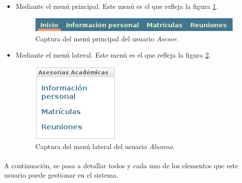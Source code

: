   \begin{itemize}
   \item Mediante el menú principal. Este menú es el que refleja la figura
   \ref{capturaMenuPrincipalAlumno}.

  \begin{figure}[!ht]
    \begin{center}
      \includegraphics[scale=0.55]{4.Funcionamiento_Aplicacion/4.3.Gestion/4.3.4.Alumno/4.3.4.1.Introduccion/menu_principal.png}
      \caption{Captura del menú principal del usuario \textit{Asesor}.}
      \label{capturaMenuPrincipalAlumno}
    \end{center}
  \end{figure}

   \item Mediante el menú lateral. Este menú es el que refleja la figura
   \ref{capturaMenuLateralAlumno}.

   \begin{figure}[!ht]
    \begin{center}
      \includegraphics[scale=0.55]{4.Funcionamiento_Aplicacion/4.3.Gestion/4.3.4.Alumno/4.3.4.1.Introduccion/menu_lateral.png}
      \caption{Captura del menú lateral del usuario \textit{Alumno}.}
      \label{capturaMenuLateralAlumno}
    \end{center}
  \end{figure}

  \end{itemize}

  \paragraph{}A continuación, se pasa a detallar todos y cada uno de los
  elementos que este usuario puede gestionar en el sistema.
